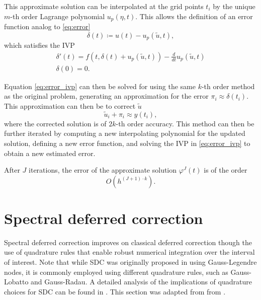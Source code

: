 This approximate solution can be interpolated at the grid points \(t_i\) by the unique \(m\)-th order Lagrange polynomial \(u_p(\eta,t)\). This allows the definition of an error function analog to \ref{eq:error}
\begin{equation}
    \delta(t) \coloneqq u(t)-u_p(\tilde{u},t),
	\label{eq:interp_error}
\end{equation}
which satisfies the IVP
\begin{gather}
    \delta'(t) = f(t,\delta(t) + u_p(\tilde{u},t)) - \frac{d}{dt}u_p(\tilde{u},t) \label{eq:error_ivp}\\ 
    \delta(0) = 0. \nonumber
\end{gather}

Equation \ref{eq:error_ivp} can then be solved for using the same \(k\)-th order method as the original problem, generating an approximation for the error \(\pi_i \approx \delta(t_i)\). This approximation can then be to correct \(\tilde{u}\)
\begin{equation}
    \tilde{u}_i + \pi_i \approx y(t_i),
	\label{eq:dc_correction}
\end{equation}
where the corrected solution is of \(2k\)-th order accuracy. This method can then be further iterated by computing a new interpolating polynomial for the updated solution, defining a new error function, and solving the IVP in \ref{eq:error_ivp} to obtain a new estimated error.

After \(J\) iterations, the error of the approximate solution \(\varphi^J(t)\) is of the order \cite{dutt2000spectral} 
\begin{equation}
    O(h^{(J+1) \cdot k}).
	\label{eq:dc_error}
\end{equation}

\section{Spectral deferred correction} \label{sec:math_sdc}

Spectral deferred correction improves on classical deferred correction though the use of quadrature rules that enable robust numerical integration over the interval of interest. Note that while SDC was originally proposed in \cite{dutt2000spectral} using Gauss-Legendre nodes, it is commonly employed using different quadrature rules, such as Gauss-Lobatto and Gauss-Radau. A detailed analysis of the implications of quadrature choices for SDC can be found in \cite{layton2005implications}. This section was adapted from from \cite{speck2015multi}.

